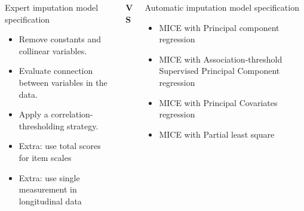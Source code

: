 \documentclass{beamer}\usepackage[]{graphicx}\usepackage[]{xcolor}
\begin{document}
\begin{frame}[fragile]
\begin{columns}
  \end{columns}

  \bigskip
  {\hrulefill}
  \bigskip


\begin{columns}[T]
\begin{column}{.42\textwidth}

\begin{block}{Expert imputation model specification}

  \begin{itemize}
      \item Remove constants and collinear variables.
      \item Evaluate connection between variables in the data.
      \item Apply a correlation-thresholding strategy.
      \item Extra: use total scores for item scales
      \item Extra: use single measurement in longitudinal data
  \end{itemize}

\end{block}

\end{column}

\begin{column}{.06\textwidth}
  \vspace{5cm}
  \begin{center}
    \huge \textbf{VS}
    \end{center}

  \end{column}

\begin{column}{.42\textwidth}

\begin{block}{Automatic imputation model specification}

  \begin{itemize}
    \item MICE with Principal component regression
    \item MICE with Association-threshold Supervised Principal Component regression
    \item MICE with Principal Covariates regression
    \item MICE with Partial least square
  \end{itemize}


\end{block}
\end{column}
\end{columns}
\end{frame}
\end{document}
